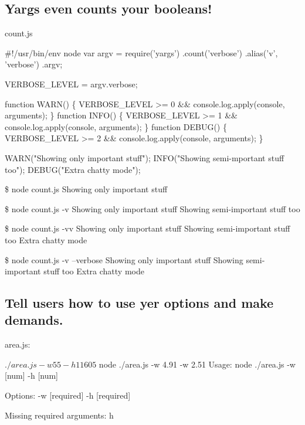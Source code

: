 \subsection*{Yargs even counts your booleans! }

count.\+js


\begin{DoxyCode}
#!/usr/bin/env node
var argv = require('yargs')
    .count('verbose')
    .alias('v', 'verbose')
    .argv;

VERBOSE\_LEVEL = argv.verbose;

function WARN()  \{ VERBOSE\_LEVEL >= 0 && console.log.apply(console, arguments); \}
function INFO()  \{ VERBOSE\_LEVEL >= 1 && console.log.apply(console, arguments); \}
function DEBUG() \{ VERBOSE\_LEVEL >= 2 && console.log.apply(console, arguments); \}

WARN("Showing only important stuff");
INFO("Showing semi-mportant stuff too");
DEBUG("Extra chatty mode");
\end{DoxyCode}




 \$ node count.\+js Showing only important stuff

\$ node count.\+js -\/v Showing only important stuff Showing semi-\/important stuff too

\$ node count.\+js -\/vv Showing only important stuff Showing semi-\/important stuff too Extra chatty mode

\$ node count.\+js -\/v --verbose Showing only important stuff Showing semi-\/important stuff too Extra chatty mode

\subsection*{Tell users how to use yer options and make demands. }

area.\+js\+:






 \begin{DoxyVerb}$ ./area.js -w 55 -h 11
605

$ node ./area.js -w 4.91 -w 2.51
Usage: node ./area.js -w [num] -h [num]

Options:
  -w  [required]
  -h  [required]

Missing required arguments: h
\end{DoxyVerb}


